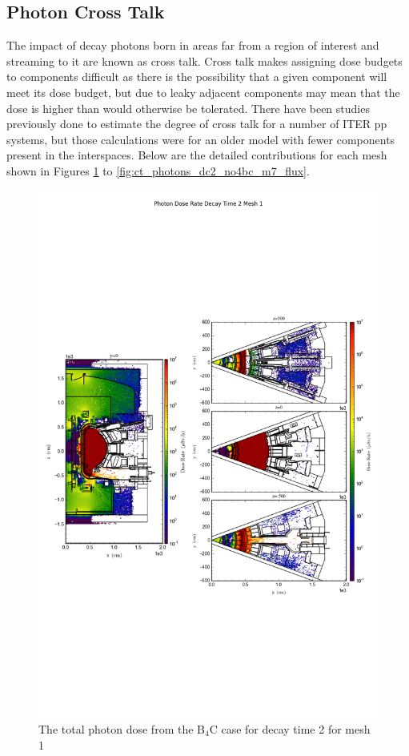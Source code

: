 \documentclass[12pt]{article}
\begin{document}
\newpage
\clearpage
\subsection{Photon Cross Talk}
The impact of decay photons born in areas far from a region of interest and 
streaming to it are known as cross talk. Cross talk makes assigning dose 
budgets to components difficult as there is the possibility that a given 
component will meet its dose budget, but due to leaky adjacent components
may mean that the dose is higher than would otherwise be tolerated. There
have been studies previously done to estimate the degree of cross talk for
a number of ITER \gls{pp} systems, but those calculations were for an older
model with fewer components present in the interspaces. Below are the 
detailed contributions for each mesh shown in Figures 
\ref{fig:ct_photons_dc2_no4bc_m1_flux} to \ref{fig:ct_photons_dc2_no4bc_m7_flux}.

\begin{figure}[ht!]
\centering
\includegraphics[trim={0cm 9cm 0cm 10cm},clip,scale=0.75]{../plots/final_model/Photon_Dose_Rate_Decay_Time_2_Mesh_1.png}
\caption{The total photon dose from the B$_4$C case for decay time 2 for mesh 1}
\label{fig:ct_photons_dc2_no4bc_m1_flux}
\end{figure}
\end{document}
